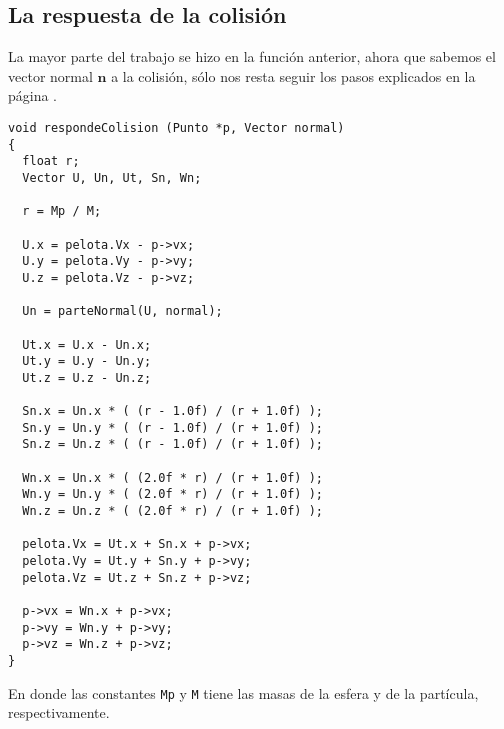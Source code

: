\subsection{La respuesta de la colisión}
La mayor parte del trabajo se hizo en la función anterior, ahora que sabemos el vector normal $\textbf{n}$ a la colisión, sólo nos resta seguir los pasos explicados en la página \pageref{alg:elasmov}.
\begin{verbatim}
void respondeColision (Punto *p, Vector normal)
{
  float r;
  Vector U, Un, Ut, Sn, Wn;

  r = Mp / M;

  U.x = pelota.Vx - p->vx;
  U.y = pelota.Vy - p->vy;
  U.z = pelota.Vz - p->vz;

  Un = parteNormal(U, normal);

  Ut.x = U.x - Un.x;
  Ut.y = U.y - Un.y;
  Ut.z = U.z - Un.z;

  Sn.x = Un.x * ( (r - 1.0f) / (r + 1.0f) );
  Sn.y = Un.y * ( (r - 1.0f) / (r + 1.0f) );
  Sn.z = Un.z * ( (r - 1.0f) / (r + 1.0f) );

  Wn.x = Un.x * ( (2.0f * r) / (r + 1.0f) );
  Wn.y = Un.y * ( (2.0f * r) / (r + 1.0f) );
  Wn.z = Un.z * ( (2.0f * r) / (r + 1.0f) );

  pelota.Vx = Ut.x + Sn.x + p->vx;
  pelota.Vy = Ut.y + Sn.y + p->vy;
  pelota.Vz = Ut.z + Sn.z + p->vz;

  p->vx = Wn.x + p->vx;
  p->vy = Wn.y + p->vy;
  p->vz = Wn.z + p->vz;
}
\end{verbatim}
En donde las constantes \verb|Mp| y \verb|M| tiene las masas de la esfera y de la partícula, respectivamente.
